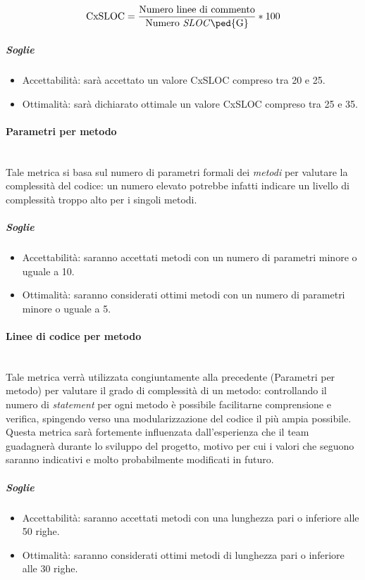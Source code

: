 	\begin{displaymath}
		\mbox{CxSLOC} =\frac{\mbox{Numero linee di commento}}{\mbox{Numero \emph{SLOC}\ped{G}}} * 100
	\end{displaymath}

\subparagraph{Soglie}
	\begin{itemize}
	\item Accettabilità: sarà accettato un valore CxSLOC compreso tra 20 e 25.
	\item Ottimalità: sarà dichiarato ottimale un valore CxSLOC compreso tra 25 e 35.
	\end{itemize}

\paragraph{Parametri per metodo}
	~\\Tale metrica si basa sul numero di parametri formali dei \emph{metodi} per valutare la complessità del codice: un numero elevato potrebbe infatti indicare un livello di complessità troppo alto per i singoli metodi.

\subparagraph{Soglie}
	\begin{itemize}
	\item Accettabilità: saranno accettati metodi con un numero di parametri minore o uguale a 10.
	\item Ottimalità: saranno considerati ottimi metodi con un numero di parametri minore o uguale a 5.
	\end{itemize}

\paragraph{Linee di codice per metodo}
	~\\Tale metrica verrà utilizzata congiuntamente alla precedente (Parametri per metodo) per valutare il grado di complessità di un metodo: controllando il numero di \emph{statement} per ogni metodo è possibile facilitarne comprensione e verifica, spingendo verso una modularizzazione del codice il più ampia possibile. 
Questa metrica sarà fortemente influenzata dall'esperienza che il team guadagnerà durante lo sviluppo del progetto, motivo per cui i valori che seguono saranno indicativi e molto probabilmente modificati in futuro.

\subparagraph{Soglie}
	\begin{itemize}
	\item Accettabilità: saranno accettati metodi con una lunghezza pari o inferiore alle  50 righe.
	\item Ottimalità: saranno considerati ottimi metodi di lunghezza pari o inferiore alle 30 righe.
	\end{itemize}

